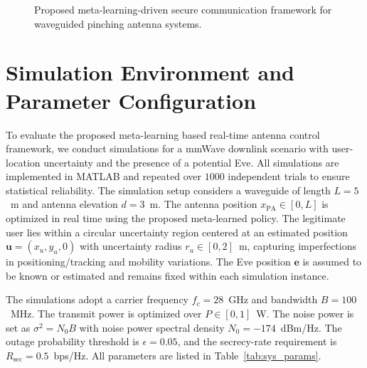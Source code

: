 \documentclass[journal,10pt]{IEEEtran}
\begin{document}
\begin{figure}[!t]
	\centering
	\def\svgwidth{245pt}
	\fontsize{8}{4}\selectfont
	\scalebox{1}{}
	\caption{Proposed meta-learning-driven secure communication framework for waveguided pinching antenna systems.} \label{fig:flow_meta_learning}
\end{figure}

\section{Simulation Environment and Parameter Configuration}\label{sec_simulations}

To evaluate the proposed meta-learning based real-time antenna control framework, we conduct simulations for a mmWave downlink scenario with user-location uncertainty and the presence of a potential Eve. All simulations are implemented in MATLAB and repeated over $1000$ independent trials to ensure statistical reliability.
The simulation setup considers a waveguide of length $L=5$~m and antenna elevation $d=3$~m. The antenna position $x_{\mathrm{PA}} \in [0,L]$ is optimized in real time using the proposed meta-learned policy. The legitimate user lies within a circular uncertainty region centered at an estimated position $\mathbf{u}=(x_u,y_u,0)$ with uncertainty radius $r_u \in [0,2]$~m, capturing imperfections in positioning/tracking and mobility variations. The Eve position $\mathbf{e}$ is assumed to be known or estimated and remains fixed within each simulation instance.

The simulations adopt a carrier frequency $f_c=28$~GHz and bandwidth $B=100$~MHz. The transmit power is optimized over $P\in[0,1]$~W. The noise power is set as $\sigma^2 = N_0 B$ with noise power spectral density $N_0=-174$~dBm/Hz. The outage probability threshold is $\epsilon=0.05$, and the secrecy-rate requirement is $R_{\mathrm{sec}}=0.5$~bps/Hz. All parameters are listed in Table~\ref{tab:sys_params}.
\end{document}
